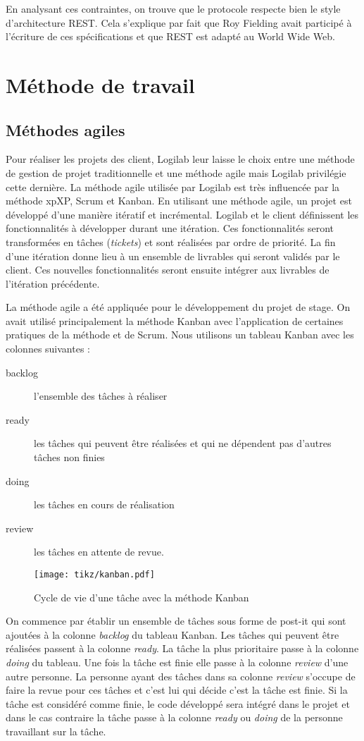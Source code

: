 En analysant ces contraintes, on trouve que le protocole  respecte bien le style d'architecture REST. Cela s'explique par fait que Roy Fielding avait participé à l'écriture de ces spécifications et que REST est adapté au World Wide Web.  
 
\section{Méthode de travail}
\subsection{Méthodes agiles}
Pour réaliser les projets des client, Logilab leur laisse le choix entre une méthode de gestion de projet traditionnelle et une méthode agile mais Logilab privilégie cette dernière. La méthode agile utilisée par Logilab est très influencée par la méthode \gls{xp}{XP}, Scrum et Kanban. En utilisant une méthode agile, un projet est développé d'une manière itératif et incrémental. Logilab et le client définissent les fonctionnalités à développer durant une itération. Ces fonctionnalités seront transformées en tâches (\textit{tickets}) et sont réalisées par ordre de priorité. La fin d'une itération donne lieu à un ensemble de livrables qui seront validés par le client. Ces nouvelles fonctionnalités seront ensuite intégrer aux livrables de l'itération précédente.

La méthode agile a été appliquée pour le développement du projet de stage. On avait utilisé principalement la méthode Kanban avec l'application de certaines pratiques de la méthode  et de Scrum. Nous utilisons un tableau Kanban avec les colonnes suivantes : 
\begin{description}
	\item[backlog] l'ensemble des tâches à réaliser
	\item[ready] les tâches qui peuvent être réalisées et qui ne dépendent pas d'autres tâches non finies
	\item[doing] les tâches en cours de réalisation
	\item[review] les tâches en attente de revue.
\end{description}
\begin{figure}
\centering
  \texttt{[image: tikz/kanban.pdf]}
  \caption{Cycle de vie d'une tâche avec la méthode Kanban}
  \label{fig:kanban}
\end{figure}
On commence par établir un ensemble de tâches sous forme de post-it qui sont ajoutées à la colonne \textit{backlog} du tableau Kanban. Les tâches qui peuvent être réalisées passent à la colonne \textit{ready}. La tâche la plus prioritaire passe à la colonne \textit{doing} du tableau. Une fois la tâche est finie elle passe à la colonne \textit{review} d'une autre personne. La personne ayant des tâches dans sa colonne \textit{review} s'occupe de faire la revue pour ces tâches et c'est lui qui décide c'est la tâche est finie. Si la tâche est considéré comme finie, le code développé sera intégré dans le projet et dans le cas contraire la tâche passe à la colonne \textit{ready} ou \textit{doing} de la personne travaillant sur la tâche. 

